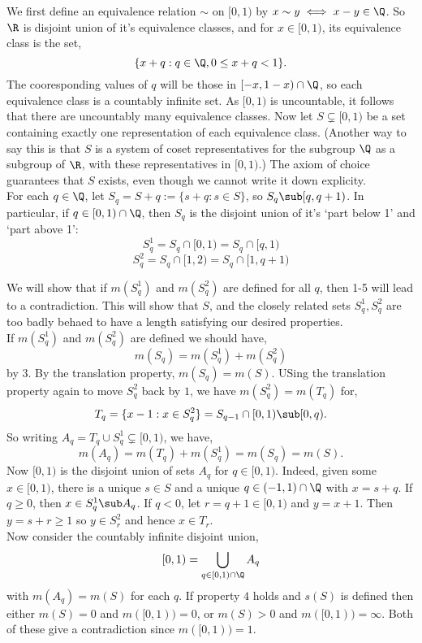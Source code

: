 \noindent
We first define an equivalence relation $\sim$ on $[0, 1)$ by $x \sim y \iff x - y \in \Q$. So $\R$ is disjoint union of it's equivalence classes, and for $x \in [0 ,1)$, its equivalence class is the set,
$$ \{x + q : q \in \Q, 0 \le x + q < 1\}. $$
The cooresponding values of $q$ will be those in $[-x, 1 - x) \cap \Q$, so each equivalence class is a countably infinite set. As $[0, 1)$ is uncountable, it follows that there are uncountably many equivalence classes. Now let $S \subsetneq [0, 1)$ be a set containing exactly one representation of each equivalence class. (Another way to say this is that $S$ is a system of coset representatives for the subgroup $\Q$ as a subgroup of $\R$, with these representatives in $[0, 1)$.) The axiom of choice guarantees that $S$ exists, even though we cannot write it down explicity. \\

\noindent
For each $q \in \Q$, let $S_q = S + q := \{s + q : s \in S\}$, so $S_q \sub [q, q + 1)$. In particular, if $q \in [0, 1) \cap \Q$, then $S_q$ is the disjoint union of it's `part below 1' and `part above 1':
$$ S_q^1 = S_q \cap [0 ,1) = S_q \cap [q, 1) $$
$$ S_q^2 = S_q \cap [1 ,2) = S_q \cap [1, q + 1) $$

\noindent
We will show that if $m(S_q^1)$ and $m(S_q^2)$ are defined for all $q$, then 1-5 will lead to a contradiction. This will show that $S$, and the closely related sets $S_q^1, S_q^2$ are too badly behaed to have a length satisfying our desired properties. \\

\noindent
If $m(S_q^1)$ and $m(S_q^2)$ are defined we should have,
$$ m(S_q) = m(S_q^1) + m(S_q^2) $$
by $3$. By the translation property, $m(S_q) = m(S)$. USing the translation property again to move $S_q^2$ back by $1$, we have $m(S_q^2) = m(T_q)$ for,
$$ T_q = \{x - 1 : x \in S_q^2\} = S_{q-1} \cap [0, 1) \sub [0, q).$$
So writing $A_q = T_q \cup S_q^1 \subsetneq [0, 1)$, we have,
$$ m(A_q) = m(T_q) + m(S_q^1) = m(S_q) = m(S). $$
Now $[0, 1)$ is the disjoint union of sets $A_q$ for $q \in [0, 1)$. Indeed, given some $x \in [0, 1)$, there is a unique $s \in S$ and a unique $q \in (-1, 1)\cap \Q$ with $x = s + q$. If $q \ge 0$, then $x \in S_q^1 \sub A_q$. If $q < 0$, let $r = q + 1 \in [0, 1)$ and $y = x+1$.
Then $y = s + r \ge 1$ so $y \in S_r^2$ and hence $x \in T_r$.\\

\noindent
Now consider the countably infinite disjoint union,
$$ [0, 1) = \bigcup_{q \in [0, 1) \cap \Q} A_q $$
with $m(A_q) = m(S)$ for each $q$. If property $4$ holds and $s(S)$ is defined then either $m(S) = 0$ and $m([0, 1)) = 0$, or $m(S) > 0$ and $m([0, 1)) = \infty$. Both of these give a contradiction since $m([0, 1))= 1$.
